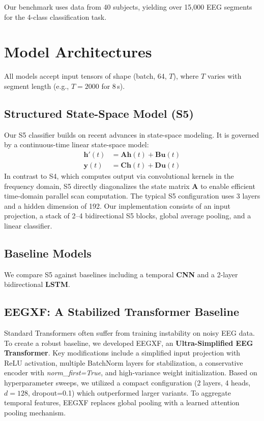 \documentclass{article}
\newcommand{\eegtrans}{EEGXF}
\begin{document}
Our benchmark uses data from 40 subjects, yielding over 15,000 EEG segments for the 4-class classification task.

\section{Model Architectures}
\label{sec:models}

All models accept input tensors of shape (batch, 64, $T$), where $T$ varies with segment length (e.g., $T=2000$ for 8\,s).

\subsection{Structured State-Space Model (S5)}
Our S5 classifier builds on recent advances in state-space modeling. It is governed by a continuous-time linear state-space model:
\begin{align}
\mathbf{h}'(t) &= \mathbf{A} \mathbf{h}(t) + \mathbf{B} \mathbf{u}(t) \\
\mathbf{y}(t) &= \mathbf{C} \mathbf{h}(t) + \mathbf{D} \mathbf{u}(t)
\end{align}
In contrast to S4, which computes output via convolutional kernels in the frequency domain, S5 directly diagonalizes the state matrix $\mathbf{A}$ to enable efficient time-domain parallel scan computation.
The typical S5 configuration uses 3 layers and a hidden dimension of 192. Our implementation consists of an input projection, a stack of 2--4 bidirectional S5 blocks, global average pooling, and a linear classifier. 

\subsection{Baseline Models}
We compare S5 against baselines including a temporal \textbf{CNN} and a 2-layer bidirectional \textbf{LSTM}.

\subsection{\eegtrans{}: A Stabilized Transformer Baseline} \label{sec:\eegtrans}
Standard Transformers often suffer from training instability on noisy EEG data. To create a robust baseline, we developed \eegtrans{}, an \textbf{Ultra-Simplified EEG Transformer}. Key modifications include a simplified input projection with ReLU activation, multiple BatchNorm layers for stabilization, a conservative encoder with \textit{norm\_first=True}, and high-variance weight initialization. Based on hyperparameter sweeps, we utilized a compact configuration (2 layers, 4 heads, $d=128$, dropout=0.1) which outperformed larger variants. To aggregate temporal features, \eegtrans{} replaces global pooling with a learned attention pooling mechanism.
\end{document}
